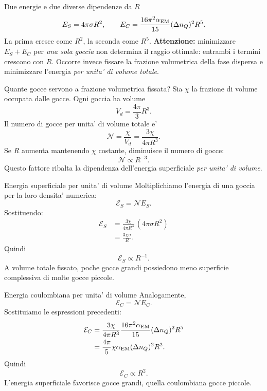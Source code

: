 \begin{frame}{Due energie e due diverse dipendenze da $R$}
\small
\[
E_S=4\pi\sigma R^2,
\qquad
E_C=\frac{16\pi^2\alpha_{\rm EM}}{15}
(\Delta n_Q)^2R^5.
\]
La prima cresce come $R^2$, la seconda come $R^5$.
\medskip
\textbf{Attenzione:} minimizzare $E_S+E_C$ per \emph{una sola goccia}
non determina il raggio ottimale: entrambi i termini crescono con $R$.
\medskip
Occorre invece fissare la frazione volumetrica della fase dispersa
e minimizzare l'energia \emph{per unita' di volume totale}.
\end{frame}

\begin{frame}{Quante gocce servono a frazione volumetrica fissata?}
\small
Sia $\chi$ la frazione di volume occupata dalle gocce.
\medskip
Ogni goccia ha volume
\[
V_d=\frac{4\pi}{3}R^3.
\]
Il numero di gocce per unita' di volume totale e'
\[
\mathcal N=\frac{\chi}{V_d}
=\frac{3\chi}{4\pi R^3}.
\]
Se $R$ aumenta mantenendo $\chi$ costante, diminuisce il numero di gocce:
\[
\mathcal N\propto R^{-3}.
\]
Questo fattore ribalta la dipendenza dell'energia superficiale
\emph{per unita' di volume}.
\end{frame}

\begin{frame}{Energia superficiale per unita' di volume}
\small
Moltiplichiamo l'energia di una goccia per la loro densita' numerica:
\[
\mathcal E_S=\mathcal N E_S.
\]
Sostituendo:
\[
\begin{aligned}
\mathcal E_S
&=\frac{3\chi}{4\pi R^3}\,(4\pi\sigma R^2)\\
&=\frac{3\chi\sigma}{R}.
\end{aligned}
\]
Quindi
\[
\mathcal E_S\propto R^{-1}.
\]
A volume totale fissato, poche gocce grandi
possiedono meno superficie complessiva di molte gocce piccole.
\end{frame}

\begin{frame}{Energia coulombiana per unita' di volume}
\small
Analogamente,
\[
\mathcal E_C=\mathcal N E_C.
\]
Sostituiamo le espressioni precedenti:
\[
\begin{aligned}
\mathcal E_C
&=\frac{3\chi}{4\pi R^3}
\frac{16\pi^2\alpha_{\rm EM}}{15}
(\Delta n_Q)^2R^5\\
&=\frac{4\pi}{5}\chi\alpha_{\rm EM}
(\Delta n_Q)^2R^2.
\end{aligned}
\]
Quindi
\[
\mathcal E_C\propto R^2.
\]
L'energia superficiale favorisce gocce grandi,
quella coulombiana gocce piccole.
\end{frame}

